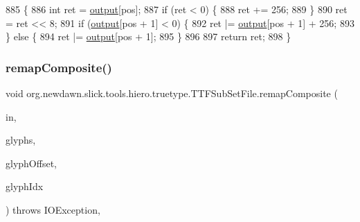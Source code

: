 \begin{DoxyCode}
885                                     \{
886         \textcolor{keywordtype}{int} ret = \mbox{\hyperlink{classorg_1_1newdawn_1_1slick_1_1tools_1_1hiero_1_1truetype_1_1_t_t_f_sub_set_file_a967f26c7cbd2c428f7ca96c4958edded}{output}}[pos];
887         \textcolor{keywordflow}{if} (ret < 0) \{
888             ret += 256;
889         \}
890         ret = ret << 8;
891         \textcolor{keywordflow}{if} (\mbox{\hyperlink{classorg_1_1newdawn_1_1slick_1_1tools_1_1hiero_1_1truetype_1_1_t_t_f_sub_set_file_a967f26c7cbd2c428f7ca96c4958edded}{output}}[pos + 1] < 0) \{
892             ret |= \mbox{\hyperlink{classorg_1_1newdawn_1_1slick_1_1tools_1_1hiero_1_1truetype_1_1_t_t_f_sub_set_file_a967f26c7cbd2c428f7ca96c4958edded}{output}}[pos + 1] + 256;
893         \} \textcolor{keywordflow}{else} \{
894             ret |= \mbox{\hyperlink{classorg_1_1newdawn_1_1slick_1_1tools_1_1hiero_1_1truetype_1_1_t_t_f_sub_set_file_a967f26c7cbd2c428f7ca96c4958edded}{output}}[pos + 1];
895         \}
896 
897         \textcolor{keywordflow}{return} ret;
898     \}
\end{DoxyCode}
\mbox{\label{classorg_1_1newdawn_1_1slick_1_1tools_1_1hiero_1_1truetype_1_1_t_t_f_sub_set_file_a1c99664772adc2dea1919d7bc183a352}} 
\subsubsection{\texorpdfstring{remap\+Composite()}{remapComposite()}}
{\footnotesize\ttfamily void org.\+newdawn.\+slick.\+tools.\+hiero.\+truetype.\+T\+T\+F\+Sub\+Set\+File.\+remap\+Composite (\begin{DoxyParamCaption}\item[{\mbox{\hyperlink{classorg_1_1newdawn_1_1slick_1_1tools_1_1hiero_1_1truetype_1_1_font_file_reader}{Font\+File\+Reader}}}]{in,  }\item[{Map}]{glyphs,  }\item[{int}]{glyph\+Offset,  }\item[{Integer}]{glyph\+Idx }\end{DoxyParamCaption}) throws I\+O\+Exception\hspace{0.3cm}{\ttfamily [inline]}, {\ttfamily [private]}}

